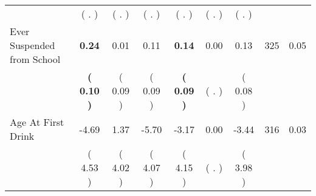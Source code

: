 \begin{tabular}{lcccccccc}
 & (        . ) & (        . ) & (        . ) & (        . ) & (        . ) & (        . ) & \\
Ever Suspended from School & \textbf{     0.24} &      0.01 &      0.11 & \textbf{     0.14} &      0.00 &      0.13 & 325 &       0.05 \\ 
 & \textbf{(     0.10 )} & (     0.09 ) & (     0.09 ) & \textbf{(     0.09 )} & (        . ) & (     0.08 ) & \\
Age At First Drink &     -4.69 &      1.37 &     -5.70 &     -3.17 &      0.00 &     -3.44 & 316 &       0.03 \\ 
 & (     4.53 ) & (     4.02 ) & (     4.07 ) & (     4.15 ) & (        . ) & (     3.98 ) & \\
\bottomrule
\end{tabular}
